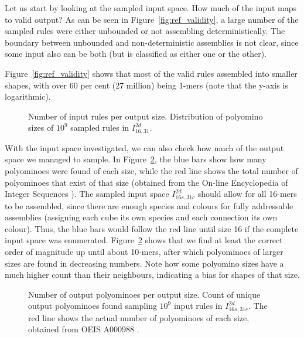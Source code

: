 Let us start by looking at the sampled input space. How much of the input maps to valid output? As can be seen in Figure~\ref{fig:ref_validity}, a large number of the sampled rules were either unbounded or not assembling deterministically. The boundary between unbounded and non-deterministic assemblies is not clear, since some input also can be both (but is classified as either one or the other).

Figure~\ref{fig:ref_validity} shows that most of the valid rules assembled into smaller shapes, with over 60 per cent (27 million) being 1-mers (note that the y-axis is logarithmic).

\begin{figure}[h]
    \centering
    \caption{Number of input rules per output size. Distribution of polyomino sizes of \(10^9\) sampled rules in \(I_{16,31}^{2d}\).
    }
    \label{fig:ref_distr}
\end{figure}

With the input space investigated, we can also check how much of the output space we managed to sample. In Figure~\ref{fig:ref_distr}, the blue bars show how many polyominoes were found of each size, while the red line shows the total number of polyominoes that exist of that size (obtained from the On-line Encyclopedia of Integer Sequences \cite{sloane1995encyclopedia, oeisA000988}). The sampled input space \(I_{16s,31c}^{2d}\) should allow for all 16-mers to be assembled, since there are enough species and colours for fully addressable assemblies (assigning each cube its own species and each connection its own colour). Thus, the blue bars would follow the red line until size 16 if the complete input space was enumerated. Figure~\ref{fig:ref_distr} shows that we find at least the correct order of magnitude up until about 10-mers, after which polyominoes of larger sizes are found in decreasing numbers. Note how some polyomino sizes have a much higher count than their neighbours, indicating a bias for shapes of that size.

\begin{figure}[h]
    \centering
    \caption{Number of output polyominoes per output size. Count of unique output polyominoes found sampling \(10^9\) input rules in \(I_{16s,31c}^{2d}\). The red line shows the actual number of polyominoes of each size, obtained from OEIS A000988 \cite{sloane1995encyclopedia, oeisA000988}.
    }
    \label{fig:ref_distr}
\end{figure}


